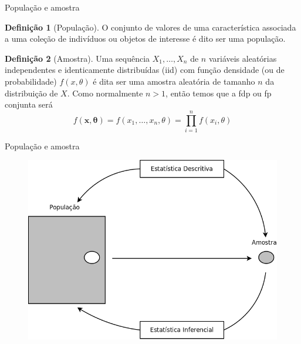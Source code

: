 \documentclass[10pt]{beamer}\usepackage[]{graphicx}\usepackage[]{color}
\newcommand{\bs}[1]{\boldsymbol{#1}}
\theoremstyle{definition}
\newtheorem*{mydef}{Definição}
\begin{document}
\begin{frame}{População e amostra}
  \begin{mydef}[População]
    O  conjunto de valores de uma característica associada a uma coleção
    de indivíduos ou objetos de interesse é dito ser uma população.
  \end{mydef}

  \begin{mydef}[Amostra]
    Uma sequência $X_1, \ldots, X_n$ de $n$ variáveis aleatórias
    independentes e identicamente distribuídas (iid) com função
    densidade (ou de probabilidade) $f(x,\theta)$ é dita ser uma amostra
    aleatória de tamanho $n$ da distribuição de $X$. Como normalmente
    $n>1$, então temos que a fdp ou fp conjunta será
    \begin{equation*}
      f(\bs{x, \theta}) = f(x_1, \ldots, x_n, \theta) = \prod_{i=1}^n
      f(x_i, \theta)
    \end{equation*}
  \end{mydef}
\end{frame}

\begin{frame}{População e amostra}
  \begin{figure}[h]
    \centering
    \includegraphics[width=.9\textwidth]{../img/populacao_amostra.png}
  \end{figure}
\end{frame}
\end{document}
